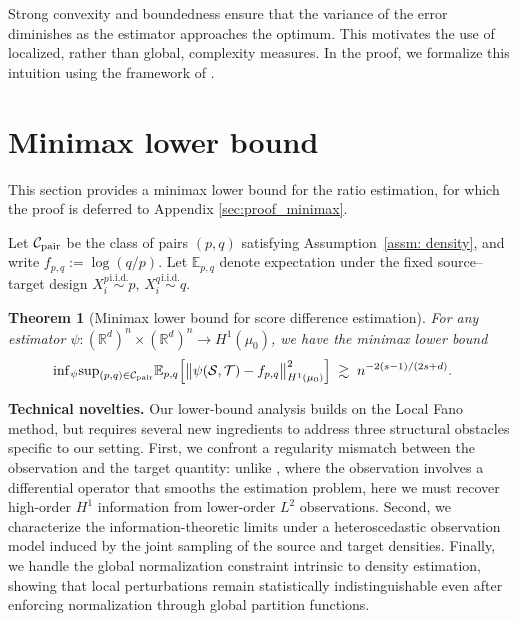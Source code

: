 \documentclass[11pt]{article}
\newcommand{\R}{\mathbb{R}}
\newcommand{\E}{\mathbb{E}}
\newcommand{\cS}{\mathcal{S}}
\newcommand{\cT}{\mathcal{T}}
\theoremstyle{plain}
\newtheorem{theorem}{Theorem}[section]
\theoremstyle{definition}
\theoremstyle{remark}
\begin{document}
Strong convexity and boundedness ensure that the variance of the error diminishes as the estimator approaches the optimum. This motivates the use of localized, rather than global, complexity measures. In the proof, we formalize this intuition using the framework of \cite{lu2021machine}.


\section{Minimax lower bound}
This section provides  a minimax lower bound for the ratio estimation, for which the proof is deferred to Appendix \ref{sec:proof_minimax}.


Let \(\mathcal C_{\rm pair}\) be the class of pairs \((p,q)\) satisfying Assumption~\ref{assm: density}, and write \(f_{p,q}:=\log(q/p)\). Let \(\mathbb E_{p,q}\) denote expectation under the fixed source--target design \(X_i^p\overset{\mathrm{i.i.d.}}{\sim}p\), \(X_i^q\overset{\mathrm{i.i.d.}}{\sim}q\).

\begin{theorem}[Minimax lower bound for score difference estimation]
\label{thm: minimax lower bound}
For any estimator $\psi:\left(\R^d\right)^n\times\left(\R^d\right)^n \to H^1(\mu_0)$, we have the minimax lower bound
\begin{align}
  &{\inf}_{\psi}{\sup}_{(p,q)\in\mathcal C_{\rm pair}}
  \E_{p,q}\Big[
    \big\|\psi(\cS,\cT)-f_{p,q}\big\|_{H^1(\mu_{0})}^2
  \Big]\nonumber\;\gtrsim\;
  n^{-2(s-1)/(2s+d)}.  \label{eq:minimax-lower-H1}
\end{align}
\end{theorem}
{\bf Technical novelties.} Our lower-bound analysis builds on the Local Fano method, but requires several new ingredients to address three structural obstacles specific to our setting.
First, we confront a regularity mismatch between the observation and the target quantity: unlike \cite{lu2021machine}, where the observation involves a differential operator that smooths the estimation problem, here we must recover high-order
$H^1$ information from lower-order
$L^2$ observations. Second, we characterize the information-theoretic limits under a heteroscedastic observation model induced by the joint sampling of the source and target densities. Finally, we handle the global normalization constraint intrinsic to density estimation, showing that local perturbations remain statistically indistinguishable even after enforcing normalization through global partition functions.
\end{document}
